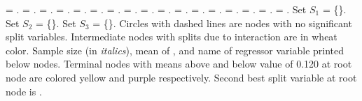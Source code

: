 \documentclass{article}
\begin{document}
\begin{landscape}
\texttt{} = \texttt{}.
\texttt{} = \texttt{}.
\texttt{} = \texttt{}.
\texttt{} = \texttt{}.
\texttt{} = \texttt{}.
\texttt{} = \texttt{}.
\texttt{} = \texttt{}.
\texttt{} = \texttt{}.
\texttt{} = \texttt{}.
\texttt{} = \texttt{}.
\texttt{} = \texttt{}.
\texttt{} = \texttt{}.
\texttt{} = \texttt{}.
\texttt{} = \texttt{}.
\texttt{} = \texttt{}.
\texttt{} = \texttt{}.
\texttt{} = \texttt{}.
 Set $S_{1}$ = \{\texttt{}\}.
 Set $S_{2}$ = \{\texttt{}\}.
 Set $S_{3}$ = \{\texttt{}\}.
 Circles with dashed lines are nodes with no significant split variables.
 Intermediate nodes with splits due to interaction are in wheat color.
Sample size (in \emph{italics}), mean of \texttt{}, and name of regressor variable printed below nodes.
 Terminal nodes with means above and below value of  0.120  at root node are colored yellow and purple respectively.
 Second best split variable at root node is \texttt{}.
 \end{landscape}
 
\end{document}
